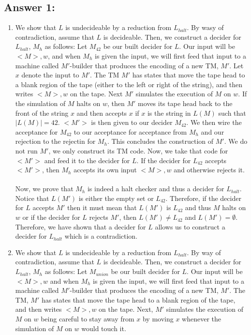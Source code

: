 \documentclass[12pt]{article}
\begin{document}
\subsection*{Answer 1:}
\begin{enumerate}
	\item We show that $L$ is undecideable by a reduction from $L_{halt}$. By wasy of contradiction, assume that $L$ is decideable. Then, we construct a decider for $L_{halt}$, $M_{h}$ as follows: 
	Let $M_{42}$ be our built decider for $L$. Our input will be $<M>, w$, and when $M_h$ is given the input, we will first feed that input to a machine called $M'$-builder that produces the encoding of a new 
	TM, $M'$. Let $x$ denote the input to $M'$. The TM $M'$ has states that move the tape head to a blank region of the tape (either to the left or right of the string), and then writes $<M>,w$ on the tape.
	Next $M'$ simulates the execution of $M$ on $w$. If the simulation of $M$ halts on $w$, then $M'$ moves its 
	tape head back to the front of the string $x$ and then accepts $x$ if $x$ is the string in $L(M)$ such that $|L(M)| = 42$. $<M'>$ is then given to our decider $M_{42}$. We then wire the acceptance for $M_{42}$ to our acceptance for acceptance from $M_{h}$ and our rejection to the rejectin for $M_{h}$. This concludes the construction of $M'$. We do not run $M'$, we only construct its TM code. Now, we take that code for $<M'>$ and feed it to the decider for $L$.
	If the decider for $L_{42}$ accepts $<M'>$, then $M_h$ accepts its own input $<M>, w$ and otherwise rejects it.\\\\
	Now, we prove that $M_h$ is indeed a halt checker and thus a decider for $L_{halt}$. Notice that $L(M')$ is either the empty set or $L_{42}$. Therefore, if the decider for $L$ accepts $M'$ then it must mean that $L(M')$ is $L_{42}$
	and thus $M$ halts on $w$ or if the decider for $L$ rejects $M'$, then $L(M') \neq L_{42}$ and $L(M') = \emptyset$. Therefore, we have shown that a decider for $L$ allows us to construct a decider for $L_{halt}$ which is a contradiction.
	\item We show that $L$ is undecideable by a reduction from $L_{halt}$. By way of contradiction, assume that $L$ is decideable. Then, we construct a decider for $L_{halt}$, $M_{h}$ as follows: Let $M_{union}$ be our built decider for $L$. Our input will be $<M>,w$ and when $M_h$ is given the input,
	we will first feed that input to a machine called $M'$-builder that produces the encoding of a new TM, $M'$. The TM, $M'$ has states that move the tape head to a blank region of the tape, and then writes $<M>, w$ on the tape. Next, $M'$ simulates the execution of $M$ on $w$ being careful to stay away from $x$ by moving $x$ whenever the simulation of $M$ on $w$ would touch it.

\end{enumerate}
\end{document}
